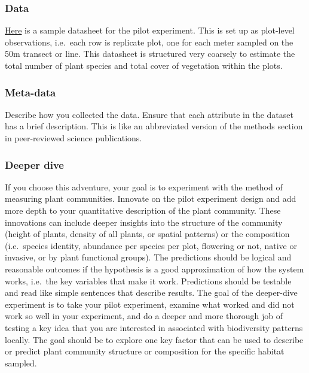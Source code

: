 \documentclass[
]{book}
\begin{document}
\hypertarget{data}{%
\subsubsection*{Data}\label{data}}

\href{https://figshare.com/articles/dataset/BIOL3250_survey_datasheet/12792482}{Here} is a sample datasheet for the pilot experiment. This is set up as plot-level observations, i.e.~each row is replicate plot, one for each meter sampled on the 50m transect or line. This datasheet is structured very coarsely to estimate the total number of plant species and total cover of vegetation within the plots.

\hypertarget{meta-data}{%
\subsubsection*{Meta-data}\label{meta-data}}

Describe how you collected the data. Ensure that each attribute in the dataset has a brief description. This is like an abbreviated version of the methods section in peer-reviewed science publications.

\hypertarget{deeper-dive}{%
\subsubsection*{Deeper dive}\label{deeper-dive}}

If you choose this adventure, your goal is to experiment with the method of measuring plant communities. Innovate on the pilot experiment design and add more depth to your quantitative description of the plant community. These innovations can include deeper insights into the structure of the community (height of plants, density of all plants, or spatial patterns) or the composition (i.e.~species identity, abundance per species per plot, flowering or not, native or invasive, or by plant functional groups). The predictions should be logical and reasonable outcomes if the hypothesis is a good approximation of how the system works, i.e.~the key variables that make it work. Predictions should be testable and read like simple sentences that describe results. The goal of the deeper-dive experiment is to take your pilot experiment, examine what worked and did not work so well in your experiment, and do a deeper and more thorough job of testing a key idea that you are interested in associated with biodiversity patterns locally. The goal should be to explore one key factor that can be used to describe or predict plant community structure or composition for the specific habitat sampled.
\end{document}
